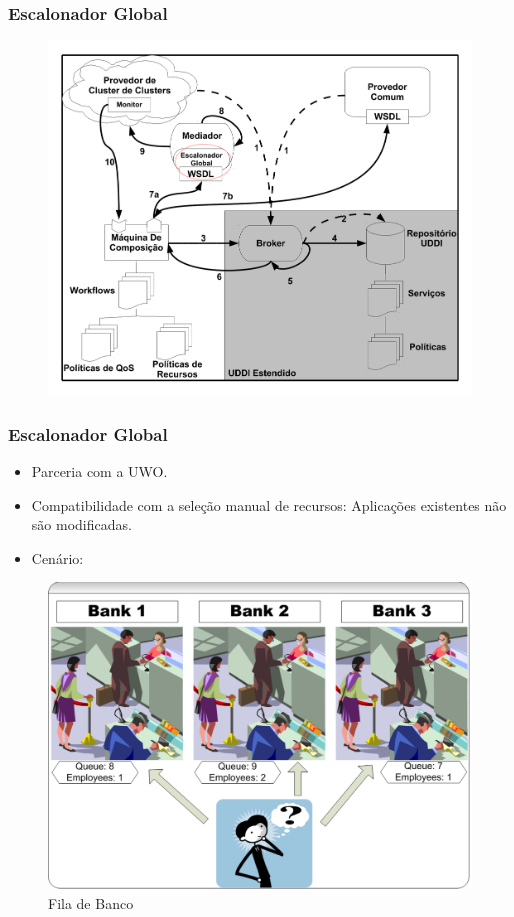 \documentclass[red, cover=invisible, theme=Warsaw]{myslides}
\begin{document}
	\begin{frame} \frametitle{Escalonador Global}
	    \begin{center}
		\begin{figure}
		\includegraphics[scale=0.25]{imagens/execComposicaoA-5.pdf}	    
		\end{figure}
	    \end{center}
	\end{frame}

	\begin{frame} \frametitle{Escalonador Global}
	    \begin{itemize}
		\item Parceria com a UWO.
		\item Compatibilidade com a seleção manual de recursos: Aplicações existentes não são modificadas.
		\item Cenário:
	    \end{itemize}
	    \begin{center}
		\begin{figure}
		\includegraphics[scale=0.15]{imagens/banco.pdf}
		\caption{Fila de Banco}
		\end{figure}
	    \end{center}
	\end{frame}
\end{document}

